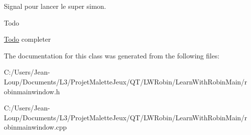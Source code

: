 Signal pour lancer le super simon. 

\begin{DoxyRefDesc}{Todo}
\item[\hyperlink{todo__todo000023}{Todo}]completer \end{DoxyRefDesc}


The documentation for this class was generated from the following files\+:\begin{DoxyCompactItemize}
\item 
C\+:/\+Users/\+Jean-\/\+Loup/\+Documents/\+L3/\+Projet\+Malette\+Jeux/\+Q\+T/\+L\+W\+Robin/\+Learn\+With\+Robin\+Main/robinmainwindow.\+h\item 
C\+:/\+Users/\+Jean-\/\+Loup/\+Documents/\+L3/\+Projet\+Malette\+Jeux/\+Q\+T/\+L\+W\+Robin/\+Learn\+With\+Robin\+Main/robinmainwindow.\+cpp\end{DoxyCompactItemize}
